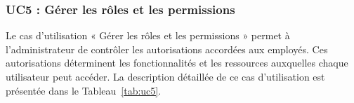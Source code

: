 
\vspace{-0.2cm}

\subsubsection{UC5 : Gérer les rôles et les permissions}

Le cas d’utilisation « Gérer les rôles et les permissions » permet à l'administrateur de contrôler les autorisations accordées aux employés. Ces autorisations déterminent les fonctionnalités et les ressources auxquelles chaque utilisateur peut accéder. La description détaillée de ce cas d’utilisation est présentée dans le Tableau~\ref{tab:uc5}.

